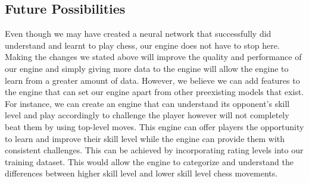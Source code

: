 \documentclass[12pt]{article}
\begin{document}
    \subsection{Future Possibilities}

    Even though we may have created a neural network that successfully did understand and learnt to play chess, our engine does not have to stop here. Making the changes we stated above will improve the quality and performance of our engine and simply giving more data to the engine will allow the engine to learn from a greater amount of data. However, we believe we can add features to the engine that can set our engine apart from other preexisting models that exist. For instance, we can create an engine that can understand its opponent's skill level and play accordingly to challenge the player however will not completely beat them by using top-level moves. This engine can offer players the opportunity to learn and improve their skill level while the engine can provide them with consistent challenges. This can be achieved by incorporating rating levels into our training dataset. This would allow the engine to categorize and understand the differences between higher skill level and lower skill level chess movements.
    
    \clearpage
    \printbibliography
\end{document}
